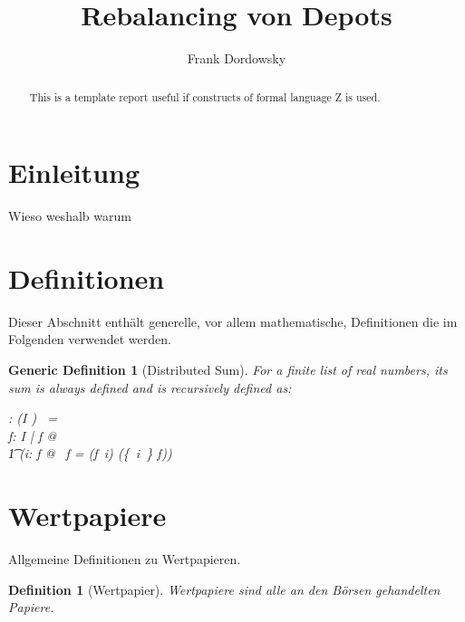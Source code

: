 \documentclass[12pt]{scrartcl}
\newtheorem{genericdef}{Generic Definition}[section]
\newtheorem{zdef}{Definition}[section]
\newcommand{\dsum}{\Sigma}
\begin{document}
\title{Rebalancing von Depots}

\author{Frank Dordowsky}

\maketitle

\begin{abstract}
This is a template report useful if constructs of formal language Z is
used.
\end{abstract}


\section{Einleitung}
\label{sec:einleitung}

Wieso weshalb warum

\section{Definitionen}
\label{sec:definitionen}
Dieser Abschnitt enthält generelle, vor allem mathematische,
Definitionen die im Folgenden verwendet werden.


\begin{genericdef}[Distributed Sum]
  \label{zdef:distributed-sum}
  For a finite list of real numbers, its sum is always defined and is
  recursively defined as:
  \begin{gendef}[I]
    \dsum : (I \ffun \arithmos) \fun \arithmos
    \where
    \dsum~\emptyset = \azero \\
    \forall f: I \ffun \arithmos | f \neq \emptyset @ \\
    \t1 (\exists i: \dom f @ \dsum~f = (f~i) \aplus
    \dsum(\{~i~\} \ndres f))
  \end{gendef}
\end{genericdef}

\section{Wertpapiere}
\label{sec:wertpapiere}
Allgemeine Definitionen zu Wertpapieren.

\begin{zdef}[Wertpapier]
  \label{zdef:wertpapier}
  Wertpapiere sind alle an den Börsen gehandelten Papiere.
  \begin{zed}
    [Wertpapier]
  \end{zed}
\end{zdef}
\end{document}
